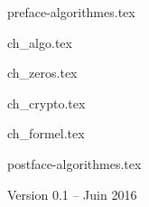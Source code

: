 \documentclass[11pt,twoside,openright]{report}
\begin{document}
\renewcommand{\contentsname}{Sommaire}

{preface-algorithmes.tex}

\debutchapitres



{ch_algo.tex}

{ch_zeros.tex}

{ch_crypto.tex}

{ch_formel.tex}



{postface-algorithmes.tex}

\vfill

\centerline{Version 0.1 -- Juin 2016}
\end{document}
